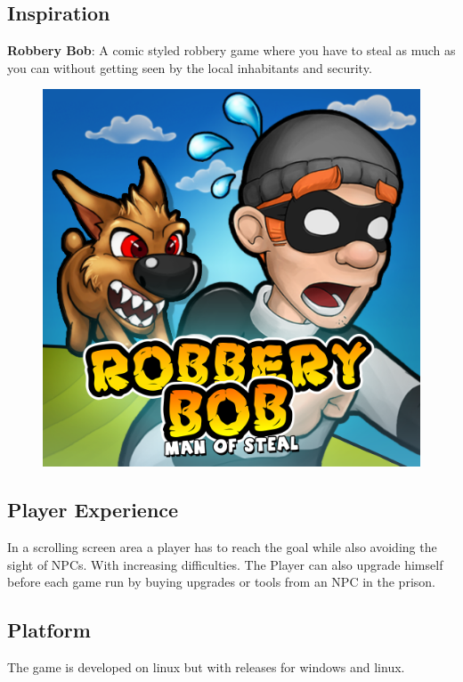 \documentclass[12pt, a4paper]{article}
\begin{document}
{        \subsection{Inspiration}
            \textbf{Robbery Bob}: A comic styled robbery game where you have to steal
            as much as you can without getting seen by the local inhabitants and security.
            \begin{figure}[h]
                \centering
                \includegraphics[scale=0.15]{./images/robberybob.png}
            \end{figure}

        \subsection{Player Experience}
            In a scrolling screen area a player has to reach the goal while also
            avoiding the sight of NPCs. With increasing difficulties.
            The Player can also upgrade himself before each game run by 
            buying upgrades or tools from an NPC in the prison.

        \subsection{Platform}
            The game is developed on linux but with releases for windows and linux.

}
\end{document}
